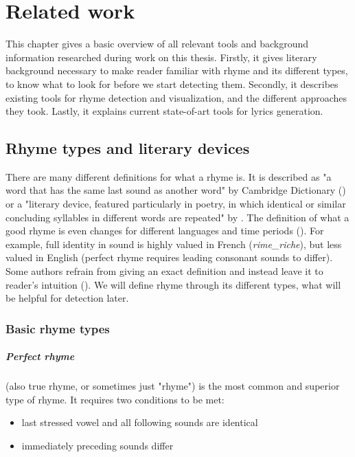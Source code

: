 \chapter{Related work}
This chapter gives a basic overview of all relevant tools and background information researched during work on this thesis. Firstly, it gives literary background necessary to make reader familiar with rhyme and its different types, to know what to look for before we start detecting them. Secondly, it describes existing tools for rhyme detection and visualization, and the different approaches they took. Lastly, it explains current state-of-art tools for lyrics generation.


\section{Rhyme types and literary devices}

There are many different definitions for what a rhyme is. It is described as "a word that has the same last sound as another word" by Cambridge Dictionary (\cite{walter2008cambridge}) or a "literary device, featured particularly in poetry, in which identical or similar concluding syllables in different words are repeated" by \cite{literarydevices2020}. The definition of what a good rhyme is even changes for different languages and time periods (\cite{zhirmunsky2013introduction}). For example, full identity in sound is highly valued in French (\textit{\gls{rime_riche}}), but less valued in English (perfect rhyme requires leading consonant sounds to differ). Some authors refrain from giving an exact definition and instead leave it to reader's intuition (\cite{plechavc2018collocation}). We will define rhyme through its different types, what will be helpful for detection later. 

\subsection{Basic rhyme types}
\paragraph{Perfect rhyme} (also true rhyme, or sometimes just "rhyme") is the most common and superior type of rhyme. It requires two conditions to be met:

\begin{itemize}
	\item last stressed vowel and all following sounds are identical
	\item immediately preceding sounds differ
\end{itemize}

